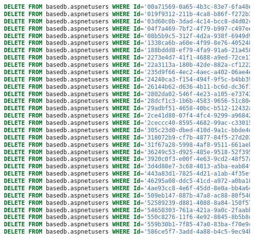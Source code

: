 \documentclass[12pt]{article}
\begin{document}
\begin{lstlisting}[language=SQL]
DELETE FROM basedb.aspnetusers WHERE Id='00a71569-0a65-4b3c-83e7-6fa48e6f9a92';
DELETE FROM basedb.aspnetusers WHERE Id='019f9312-211b-4ca8-b86f-f272b3e7459c';
DELETE FROM basedb.aspnetusers WHERE Id='03d60c0b-3dad-4c14-bcc8-d4d02c35933d';
DELETE FROM basedb.aspnetusers WHERE Id='04f7a469-7bf2-4f79-b997-c497eebe07c9';
DELETE FROM basedb.aspnetusers WHERE Id='08b5b9c5-312f-4d2a-938f-6949d9771d84';
DELETE FROM basedb.aspnetusers WHERE Id='1338ca6b-a60e-4f99-8e76-4052485f553e';
DELETE FROM basedb.aspnetusers WHERE Id='188bddd8-ef79-4fa9-91a6-21a458297edd';
DELETE FROM basedb.aspnetusers WHERE Id='2273e4d7-41f1-4688-a9ed-72ce17210d0c';
DELETE FROM basedb.aspnetusers WHERE Id='22a3113a-180b-42de-882a-cf12221a8842';
DELETE FROM basedb.aspnetusers WHERE Id='235d9f66-4ec2-4aec-a402-06ae4e5eb5e7';
DELETE FROM basedb.aspnetusers WHERE Id='24240ca3-f154-494f-9f5c-b4bb39591aca';
DELETE FROM basedb.aspnetusers WHERE Id='26144b62-d636-4b11-bc6d-dc36f165224e';
DELETE FROM basedb.aspnetusers WHERE Id='2802da02-546f-4e23-a105-e7374359509e';
DELETE FROM basedb.aspnetusers WHERE Id='28dcf1c3-1b6b-4583-9656-51c8048a1fe1';
DELETE FROM basedb.aspnetusers WHERE Id='29adbf51-4658-40bc-b512-12432ab55b9e';
DELETE FROM basedb.aspnetusers WHERE Id='2ce41d80-07f4-4fc4-9299-a968422a1e5b';
DELETE FROM basedb.aspnetusers WHERE Id='2ceccc40-8595-4682-99ac-c330157ef1c0';
DELETE FROM basedb.aspnetusers WHERE Id='305c23d0-dbed-410d-9a1c-bbde4d5f40b6';
DELETE FROM basedb.aspnetusers WHERE Id='318072b9-cf7b-4877-84f5-27d2031528ea';
DELETE FROM basedb.aspnetusers WHERE Id='31f67a28-5998-4af8-9511-661aeb7627df';
DELETE FROM basedb.aspnetusers WHERE Id='36249c53-d925-485e-9518-52f395b0d4bb';
DELETE FROM basedb.aspnetusers WHERE Id='3920c0f3-e00f-4e63-9cd2-48f57ae69048';
DELETE FROM basedb.aspnetusers WHERE Id='3d4d88e7-3c68-4013-a5ba-eab84ff0b31a';
DELETE FROM basedb.aspnetusers WHERE Id='443a83d1-7825-4d21-a1ab-4f35eff72d10';
DELETE FROM basedb.aspnetusers WHERE Id='46295a08-ddc5-41cd-a972-a0ba180c24bb';
DELETE FROM basedb.aspnetusers WHERE Id='4ae93cc8-4e6f-45dd-8e0a-bb4a645f638a';
DELETE FROM basedb.aspnetusers WHERE Id='509eb147-887b-47a8-ac88-80f540c18622';
DELETE FROM basedb.aspnetusers WHERE Id='52589239-d881-4088-8a84-150f5775d034';
DELETE FROM basedb.aspnetusers WHERE Id='54650303-761a-421a-9a0c-2faabbe4c718';
DELETE FROM basedb.aspnetusers WHERE Id='550c8276-11f6-4e92-8845-8b5b8d8f0008';
DELETE FROM basedb.aspnetusers WHERE Id='559b30b1-7f85-47a0-83ba-f70e9c3d35aa';
DELETE FROM basedb.aspnetusers WHERE Id='586ce5f7-3add-4a88-b4c5-9ec94bd79d70';

\end{lstlisting}
\end{document}
